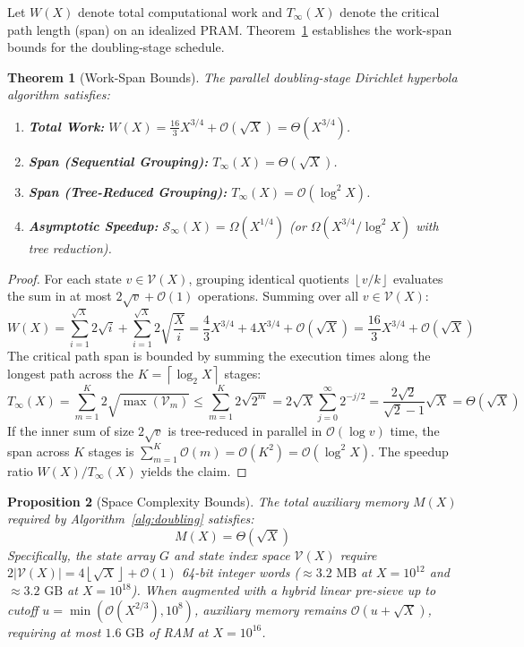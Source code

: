 \documentclass[11pt,a4paper]{article}
\theoremstyle{plain}
\newtheorem{theorem}{Theorem}[section]
\newtheorem{proposition}[theorem]{Proposition}
\theoremstyle{definition}
\newcommand{\V}{\mathcal{V}}
\newcommand{\Oh}{\mathcal{O}}
\newcommand{\floor}[1]{\left\lfloor #1 \right\rfloor}
\newcommand{\ceil}[1]{\left\lceil #1 \right\rceil}
\newcommand{\abs}[1]{\left| #1 \right|}
\begin{document}
Let $W(X)$ denote total computational work and $T_\infty(X)$ denote the critical path length (span) on an idealized PRAM. Theorem~\ref{thm:complexity} establishes the work-span bounds for the doubling-stage schedule.

\begin{theorem}[Work-Span Bounds]
\label{thm:complexity}
The parallel doubling-stage Dirichlet hyperbola algorithm satisfies:
\begin{enumerate}
    \item \textbf{Total Work:} $W(X) = \frac{16}{3} X^{3/4} + \Oh(\sqrt{X}) = \Theta(X^{3/4})$.
    \item \textbf{Span (Sequential Grouping):} $T_\infty(X) = \Theta(\sqrt{X})$.
    \item \textbf{Span (Tree-Reduced Grouping):} $T_\infty(X) = \Oh(\log^2 X)$.
    \item \textbf{Asymptotic Speedup:} $\mathcal{S}_\infty(X) = \Omega(X^{1/4})$ (or $\Omega(X^{3/4}/\log^2 X)$ with tree reduction).
\end{enumerate}
\end{theorem}

\begin{proof}
For each state $v \in \V(X)$, grouping identical quotients $\floor{v/k}$ evaluates the sum in at most $2\sqrt{v} + \Oh(1)$ operations. Summing over all $v \in \V(X)$:
\begin{equation}
    W(X) = \sum_{i=1}^{\sqrt{X}} 2\sqrt{i} + \sum_{i=1}^{\sqrt{X}} 2\sqrt{\frac{X}{i}} = \frac{4}{3}X^{3/4} + 4X^{3/4} + \Oh(\sqrt{X}) = \frac{16}{3}X^{3/4} + \Oh(\sqrt{X})
\end{equation}
The critical path span is bounded by summing the execution times along the longest path across the $K = \ceil{\log_2 X}$ stages:
\begin{equation}
    T_\infty(X) = \sum_{m=1}^K 2\sqrt{\max(\V_m)} \le \sum_{m=1}^K 2\sqrt{2^m} = 2\sqrt{X} \sum_{j=0}^\infty 2^{-j/2} = \frac{2\sqrt{2}}{\sqrt{2}-1} \sqrt{X} = \Theta(\sqrt{X})
\end{equation}
If the inner sum of size $2\sqrt{v}$ is tree-reduced in parallel in $\Oh(\log v)$ time, the span across $K$ stages is $\sum_{m=1}^K \Oh(m) = \Oh(K^2) = \Oh(\log^2 X)$. The speedup ratio $W(X)/T_\infty(X)$ yields the claim.
\end{proof}

\begin{proposition}[Space Complexity Bounds]
\label{prop:space}
The total auxiliary memory $M(X)$ required by Algorithm~\ref{alg:doubling} satisfies:
\begin{equation}
    M(X) = \Theta(\sqrt{X})
\end{equation}
Specifically, the state array $G$ and state index space $\V(X)$ require $2\abs{\V(X)} = 4\floor{\sqrt{X}} + \Oh(1)$ 64-bit integer words ($\approx 3.2\text{ MB}$ at $X = 10^{12}$ and $\approx 3.2\text{ GB}$ at $X = 10^{18}$). When augmented with a hybrid linear pre-sieve up to cutoff $u = \min(\Oh(X^{2/3}), 10^8)$, auxiliary memory remains $\Oh(u + \sqrt{X})$, requiring at most $1.6\text{ GB}$ of RAM at $X = 10^{16}$.
\end{proposition}
\end{document}
